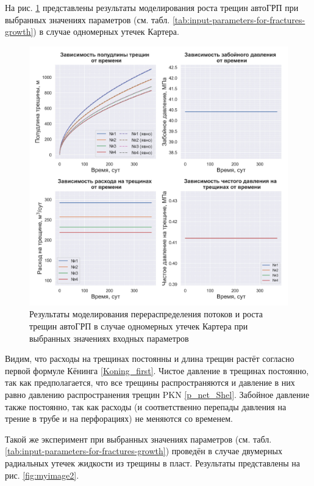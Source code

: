 На рис. \ref{fig:myimage1} представлены результаты моделирования роста трещин автоГРП при выбранных значениях параметров (см. табл. \ref{tab:input-parameters-for-fractures-growth}) в случае одномерных утечек Картера.

\begin{figure}[H] 
\center
\includegraphics[width=\linewidth]{images/myimage1.jpg}
\caption{Результаты моделирования перераспределения потоков и роста трещин автоГРП в случае одномерных утечек Картера при выбранных значениях входных параметров}
\label{fig:myimage1}
\end{figure}

Видим, что расходы на трещинах постоянны и длина трещин растёт согласно первой формуле Кёнинга \eqref{Koning_first}.
Чистое давление в трещинах постоянно, так как предполагается, что все трещины распространяются и давление в них равно давлению распространения трещин PKN \eqref{p_net_Shel}.
Забойное давление также постоянно, так как расходы (и соответственно перепады давления на трение в трубе и на перфорациях) не меняются со временем.

Такой же эксперимент при выбранных значениях параметров (см. табл. \ref{tab:input-parameters-for-fractures-growth}) проведён в случае двумерных радиальных утечек жидкости из трещины в пласт.
Результаты представлены на рис. \ref{fig:myimage2}.

